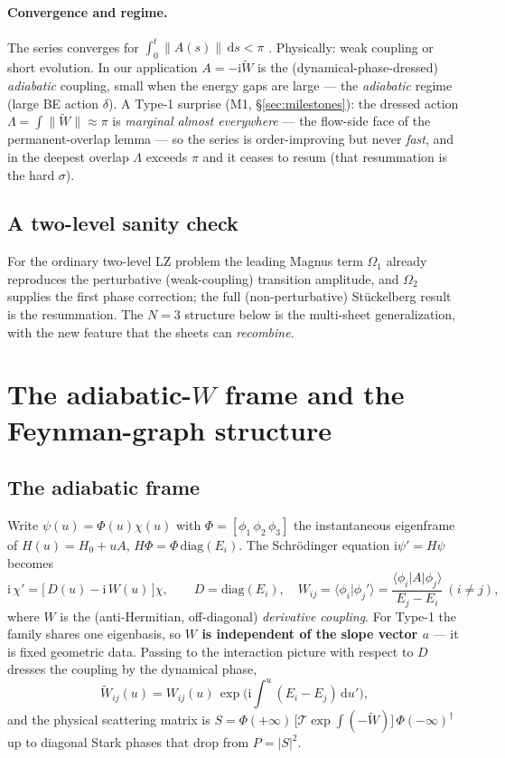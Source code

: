 \documentclass[11pt]{article}
\newcommand{\dd}{\mathrm{d}}
\newcommand{\ii}{\mathrm{i}}
\newcommand{\Tord}{\mathcal{T}}
\newcommand{\Wt}{\widetilde W}
\newcommand{\norm}[1]{\lVert #1 \rVert}
\begin{document}
\paragraph{Convergence and regime.} The series converges for
$\int_0^t\norm{A(s)}\,\dd s<\pi$ \cite{BlanesCasas2009}. Physically: weak coupling or short evolution. In
our application $A=-\ii\Wt$ is the (dynamical-phase-dressed) \emph{adiabatic} coupling, small when the
energy gaps are large --- the \emph{adiabatic} regime (large BE action $\delta$). A Type-1 surprise (M1,
\S\ref{sec:milestones}): the dressed action $\Lambda=\int\norm{\Wt}\approx\pi$ is \emph{marginal almost
everywhere} --- the flow-side face of the permanent-overlap lemma --- so the series is order-improving but
never \emph{fast}, and in the deepest overlap $\Lambda$ exceeds $\pi$ and it ceases to resum (that
resummation is the hard $\sigma$).

\subsection{A two-level sanity check}
For the ordinary two-level LZ problem the leading Magnus term $\Omega_1$ already reproduces the perturbative
(weak-coupling) transition amplitude, and $\Omega_2$ supplies the first phase correction; the full
(non-perturbative) St\"uckelberg result is the resummation. The $N{=}3$ structure below is the multi-sheet
generalization, with the new feature that the sheets can \emph{recombine}.

\section{The adiabatic-$W$ frame and the Feynman-graph structure}\label{sec:feynman}

\subsection{The adiabatic frame}
Write $\psi(u)=\Phi(u)\chi(u)$ with $\Phi=[\phi_1\,\phi_2\,\phi_3]$ the instantaneous eigenframe of
$H(u)=H_0+uA$, $H\Phi=\Phi\,\mathrm{diag}(E_i)$. The Schr\"odinger equation $\ii\psi'=H\psi$ becomes
\begin{equation}
\ii\,\chi'=\big[\,D(u)-\ii\,W(u)\,\big]\chi,\qquad D=\mathrm{diag}(E_i),\quad
W_{ij}=\langle\phi_i|\phi_j'\rangle=\frac{\langle\phi_i|A|\phi_j\rangle}{E_j-E_i}\ (i\neq j),
\label{eq:adiabatic}
\end{equation}
where $W$ is the (anti-Hermitian, off-diagonal) \emph{derivative coupling}. For Type-1 the family shares
one eigenbasis, so \textbf{$W$ is independent of the slope vector $a$} --- it is fixed geometric data.
Passing to the interaction picture with respect to $D$ dresses the coupling by the dynamical phase,
\begin{equation}
\Wt_{ij}(u)=W_{ij}(u)\,\exp\!\Big(\ii\!\int^u\!(E_i-E_j)\,\dd u'\Big),
\end{equation}
and the physical scattering matrix is
$S=\Phi(+\infty)\,\big[\Tord\exp\!\int(-\Wt)\big]\,\Phi(-\infty)^\dagger$ up to diagonal Stark phases that
drop from $P=|S|^2$.
\end{document}
